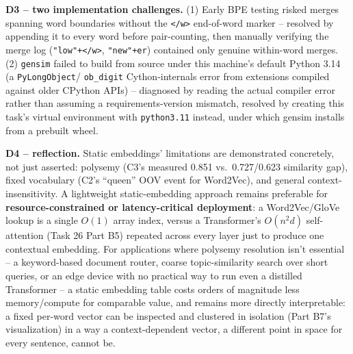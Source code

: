 \documentclass[11pt,a4paper]{article}
\begin{document}
\textbf{D3 -- two implementation challenges.} (1) Early BPE testing risked merges spanning
word boundaries without the \texttt{</w>} end-of-word marker -- resolved by appending it to
every word before pair-counting, then manually verifying the merge log (\texttt{"low"+</w>},
\texttt{"new"+er}) contained only genuine within-word merges. (2) \texttt{gensim} failed to
build from source under this machine's default Python 3.14 (a \texttt{PyLongObject}/
\texttt{ob\_digit} Cython-internals error from extensions compiled against older CPython
APIs) -- diagnosed by reading the actual compiler error rather than assuming a
requirements-version mismatch, resolved by creating this task's virtual environment with
\texttt{python3.11} instead, under which gensim installs from a prebuilt wheel.

\textbf{D4 -- reflection.} Static embeddings' limitations are demonstrated concretely, not
just asserted: polysemy (C3's measured 0.851 vs.\ 0.727/0.623 similarity gap), fixed
vocabulary (C2's ``queen'' OOV event for Word2Vec), and general context-insensitivity. A
lightweight static-embedding approach remains preferable for \textbf{resource-constrained or
latency-critical deployment}: a Word2Vec/GloVe lookup is a single $O(1)$ array index, versus
a Transformer's $O(n^2d)$ self-attention (Task 26 Part B5) repeated across every layer just
to produce one contextual embedding. For applications where polysemy resolution isn't
essential -- a keyword-based document router, coarse topic-similarity search over short
queries, or an edge device with no practical way to run even a distilled Transformer -- a
static embedding table costs orders of magnitude less memory/compute for comparable value,
and remains more directly interpretable: a fixed per-word vector can be inspected and
clustered in isolation (Part B7's visualization) in a way a context-dependent vector, a
different point in space for every sentence, cannot be.
\end{document}
